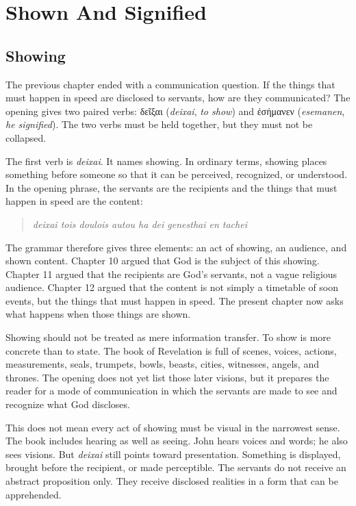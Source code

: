 \chapter{Shown And Signified}

\section{Showing}

The previous chapter ended with a communication question. If the things that must happen in speed are disclosed to servants, how are they communicated? The opening gives two paired verbs: \textgreek{δεῖξαι} (\textit{deixai}, \textit{to show}) and \textgreek{ἐσήμανεν} (\textit{esemanen}, \textit{he signified}). The two verbs must be held together, but they must not be collapsed.

The first verb is \textit{deixai}. It names showing. In ordinary terms, showing places something before someone so that it can be perceived, recognized, or understood. In the opening phrase, the servants are the recipients and the things that must happen in speed are the content:

\begin{quote}
\textit{deixai tois doulois autou ha dei genesthai en tachei}
\end{quote}

The grammar therefore gives three elements: an act of showing, an audience, and shown content. Chapter 10 argued that God is the subject of this showing. Chapter 11 argued that the recipients are God's servants, not a vague religious audience. Chapter 12 argued that the content is not simply a timetable of soon events, but the things that must happen in speed. The present chapter now asks what happens when those things are shown.

Showing should not be treated as mere information transfer. To show is more concrete than to state. The book of Revelation is full of scenes, voices, actions, measurements, seals, trumpets, bowls, beasts, cities, witnesses, angels, and thrones. The opening does not yet list those later visions, but it prepares the reader for a mode of communication in which the servants are made to see and recognize what God discloses.

This does not mean every act of showing must be visual in the narrowest sense. The book includes hearing as well as seeing. John hears voices and words; he also sees visions. But \textit{deixai} still points toward presentation. Something is displayed, brought before the recipient, or made perceptible. The servants do not receive an abstract proposition only. They receive disclosed realities in a form that can be apprehended.

